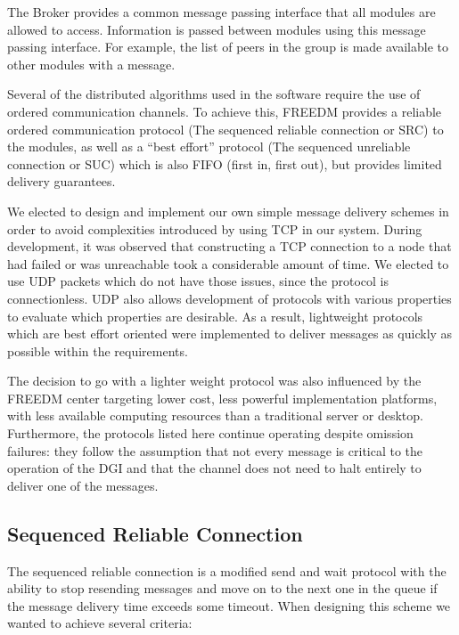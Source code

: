 The Broker provides a common message passing interface that all modules are allowed to access. Information is passed between modules using this message passing interface. For example, the list of peers in the group is made available to other modules with a message.

Several of the distributed algorithms used in the software require the use of ordered communication channels. To achieve this, FREEDM provides a reliable ordered communication protocol (The sequenced reliable connection or SRC) to the modules, as well as a ``best effort'' protocol (The sequenced unreliable connection or SUC) which is also FIFO (first in, first out), but provides limited delivery guarantees.

We elected to design and implement our own simple message delivery schemes in order to avoid complexities introduced by using TCP in our system. During development, it was observed that constructing a TCP connection to a node that had failed or was unreachable took a considerable amount of time. We elected to use UDP packets which do not have those issues, since the protocol is connectionless. UDP also allows development of protocols with various properties to evaluate which properties are desirable. As a result, lightweight protocols which are best effort oriented were implemented to deliver messages as quickly as possible within the requirements.

The decision to go with a lighter weight protocol was also influenced by the FREEDM center targeting lower cost, less powerful implementation platforms, with less available computing resources than a traditional server or desktop. Furthermore, the protocols listed here continue operating despite omission failures: they follow the assumption that not every message is critical to the operation of the DGI and that the channel does not need to halt entirely to deliver one of the messages.

\subsection{Sequenced Reliable Connection}

The sequenced reliable connection is a modified send and wait protocol with the ability to stop resending messages and move on to the next one in the queue if the message delivery time exceeds some timeout. When designing this scheme we wanted to achieve several criteria:

